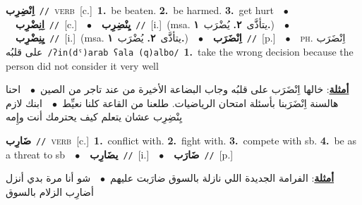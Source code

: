 \documentclass[10pt,a4paper,twoside]{article} %
\begin{document}
\begin{multicols}{2}
{{{{{{{{{{{\setlength\topsep{0pt}\textbf{\foreignlanguage{arabic}{اِنْضِرِب}}\ {\color{gray}\texttt{//}\color{black}}\ \textsc{verb}\ [c.]\ \textbf{1.}~be beaten.  \textbf{2.}~be harmed.  \textbf{3.}~get hurt\ \ $\bullet$\ \ \setlength\topsep{0pt}\textbf{\foreignlanguage{arabic}{اِنِضْرِب}}\ {\color{gray}\texttt{//}\color{black}}\ [c.]\ \ $\bullet$\ \ \setlength\topsep{0pt}\textbf{\foreignlanguage{arabic}{يِنْضِرِب}}\ {\color{gray}\texttt{//}\color{black}}\ [i.]\ \color{gray}(msa. \foreignlanguage{arabic}{يتأذَّى}~\foreignlanguage{arabic}{\textbf{٢.}}  \foreignlanguage{arabic}{يُضْرَب}~\foreignlanguage{arabic}{\textbf{١.}})\color{black}\ \ $\bullet$\ \ \setlength\topsep{0pt}\textbf{\foreignlanguage{arabic}{يِنِضْرِب}}\ {\color{gray}\texttt{//}\color{black}}\ [i.]\ \color{gray}(msa. \foreignlanguage{arabic}{يتأذَّى}~\foreignlanguage{arabic}{\textbf{٢.}}  \foreignlanguage{arabic}{يُضْرَب}~\foreignlanguage{arabic}{\textbf{١.}})\color{black}\ \ $\bullet$\ \ \setlength\topsep{0pt}\textbf{\foreignlanguage{arabic}{اِنْضَرَب}}\ {\color{gray}\texttt{//}\color{black}}\ [p.]\ \ $\bullet$\ \ \textsc{ph.} \color{gray} \foreignlanguage{arabic}{اِنْضَرَب على قلبُه}\color{black}\ {\color{gray}\texttt{/{\sffamily ʔin(dˤ)arab ʕala (q)albo}/}\color{black}}\ \textbf{1.}~take the wrong decision because the person did not consider it very well\  \begin{flushright}\color{gray}\foreignlanguage{arabic}{\textbf{\underline{\foreignlanguage{arabic}{أمثلة}}}: خالها اِنْضَرَب على قلبُه وجاب البضاعة الأخيرة من عند تاجر من الصين\ $\bullet$\ \  احنا هالسنة اِنْضَرَبنا بأسئلة امتحان الرياضيات. طلعنا من القاعة كلنا نعيِّط\ $\bullet$\ \  ابنك لازم يِنْضِرِب عشان يتعلم كيف يحترمك أنت وإِمه}\end{flushright}\color{black}} \vspace{2mm}

{\setlength\topsep{0pt}\textbf{\foreignlanguage{arabic}{ضَارِب}}\ {\color{gray}\texttt{//}\color{black}}\ \textsc{verb}\ [c.]\ \textbf{1.}~conflict with.  \textbf{2.}~fight with.  \textbf{3.}~compete with sb.  \textbf{4.}~be as a threat to sb\ \ $\bullet$\ \ \setlength\topsep{0pt}\textbf{\foreignlanguage{arabic}{يضَارِب}}\ {\color{gray}\texttt{//}\color{black}}\ [i.]\ \ $\bullet$\ \ \setlength\topsep{0pt}\textbf{\foreignlanguage{arabic}{ضَارَب}}\ {\color{gray}\texttt{//}\color{black}}\ [p.]\  \begin{flushright}\color{gray}\foreignlanguage{arabic}{\textbf{\underline{\foreignlanguage{arabic}{أمثلة}}}: الفرامة الجديدة اللي نازلة بالسوق ضارَبت عليهم\ $\bullet$\ \  شو أنا مرة بدي أنزل أضارِب الزلام بالسوق}\end{flushright}\color{black}} \vspace{2mm}

}}}}}}}}}}
\end{multicols}
\end{document}
